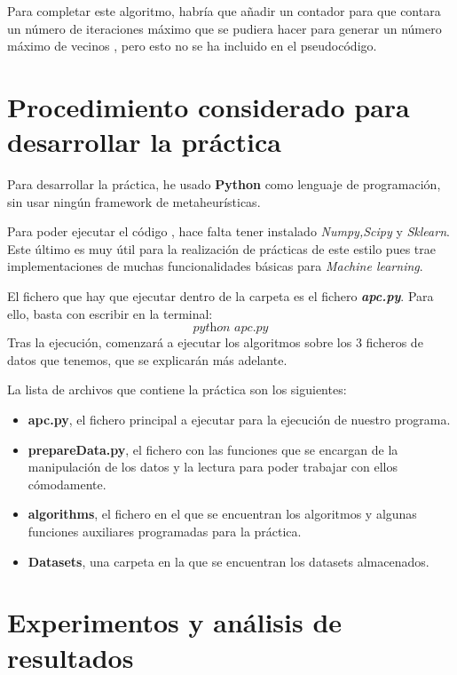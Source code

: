 \documentclass[11pt]{article}
\begin{document}
Para completar este algoritmo, habría que añadir un contador para que contara un número de iteraciones máximo que se pudiera hacer para generar un número máximo de vecinos , pero esto no se ha incluido en el pseudocódigo.



\section{Procedimiento considerado para desarrollar la práctica}
Para desarrollar la práctica, he usado \textbf{Python} como lenguaje de programación, sin usar ningún framework de metaheurísticas.

Para poder ejecutar el código , hace falta tener instalado \emph{Numpy,Scipy} y \emph{Sklearn}. Este último es muy útil para la realización de prácticas de este estilo pues trae implementaciones de muchas funcionalidades básicas para \emph{Machine learning}.

El fichero que hay que ejecutar dentro de la carpeta es el fichero \emph{\textbf{apc.py}}. Para ello, basta con escribir en la terminal:
\[
\textit{python apc.py}
\]
Tras la ejecución, comenzará a ejecutar los algoritmos sobre los 3 ficheros de datos que tenemos, que se explicarán más adelante.

La lista de archivos que contiene la práctica son los siguientes:
\begin{itemize}
	\item \textbf{apc.py}, el fichero principal a ejecutar para la ejecución de nuestro programa.
	\item \textbf{prepareData.py}, el fichero con las funciones que se encargan de la manipulación de los datos y la lectura para poder trabajar con ellos cómodamente.
	\item \textbf{algorithms}, el fichero en el que se encuentran los algoritmos y algunas funciones auxiliares programadas para la práctica.
	\item \textbf{Datasets}, una carpeta en la que se encuentran los datasets almacenados.
	
\end{itemize}

\section{Experimentos y análisis de resultados}
\end{document}
